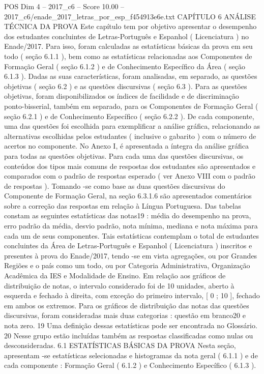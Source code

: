 \begin{textsample}{POS Dim 4 – 2017\_c6 – Score 10.00 – 2017\_c6/enade\_2017\_letras\_por\_esp\_f454913e6e.txt}  \label{ex:f4_pos_035}
CAPÍTULO 6 ANÁLISE TÉCNICA DA PROVA Este capítulo tem por objetivo apresentar o desempenho dos estudantes concluintes de Letras-Português e Espanhol ( Licenciatura ) no Enade/2017.
Para isso, foram calculadas as estatísticas básicas da prova em seu todo ( seção 6.1.1 ), bem como as estatísticas relacionadas aos Componentes de Formação Geral ( seção 6.1.2 ) e de Conhecimento Específico da Área ( seção 6.1.3 ).
Dadas as suas características, foram analisadas, em separado, as questões objetivas ( seção 6.2 ) e as questões discursivas ( seção 6.3 ).
Para as questões objetivas, foram disponibilizados os índices de facilidade e de discriminação ponto-bisserial, também em separado, para os Componentes de Formação Geral ( seção 6.2.1 ) e de Conhecimento Específico ( seção 6.2.2 ).
De cada componente, uma das questões foi escolhida para exemplificar a análise gráfica, relacionando as alternativas escolhidas pelos estudantes ( inclusive o gabarito ) com o número de acertos no componente.
No Anexo I, é apresentada a íntegra da análise gráfica para todas as questões objetivas.
Para cada uma das questões discursivas, os conteúdos dos tipos mais comuns de respostas dos estudantes são apresentados e comparados com o padrão de respostas esperado ( ver Anexo VIII com o padrão de respostas ).
Tomando -se como base as duas questões discursivas do Componente de Formação Geral, na seção 6.3.1.6 são apresentados comentários sobre a correção das respostas em relação à Língua Portuguesa.
Das tabelas constam as seguintes estatísticas das notas19 : média do desempenho na prova, erro padrão da média, desvio padrão, nota mínima, mediana e nota máxima para cada um de seus componentes.
Tais estatísticas contemplam o total de estudantes concluintes da Área de Letras-Português e Espanhol ( Licenciatura ) inscritos e presentes à prova do Enade/2017, tendo -se em vista agregações, ou por Grandes Regiões e o país como um todo, ou por Categoria Administrativa, Organização Acadêmica da IES e Modalidade de Ensino.
Em relação aos gráficos de distribuição de notas, o intervalo considerado foi de 10 unidades, aberto à esquerda e fechado à direita, com exceção do primeiro intervalo, [ 0 ; 10 ], fechado em ambos os extremos.
Para os gráficos de distribuição das notas das questões discursivas, foram consideradas mais duas categorias : questão em branco20 e nota zero. 19 Uma definição dessas estatísticas pode ser encontrada no Glossário. 20 Nesse grupo estão incluídas também as respostas classificadas como nulas ou desconsideradas. 6.1 ESTATÍSTICAS BÁSICAS DA PROVA Nesta seção, apresentam -se estatísticas selecionadas e histogramas da nota geral ( 6.1.1 ) e de cada componente : Formação Geral ( 6.1.2 ) e Conhecimento Específico ( 6.1.3 ).

\end{textsample}
